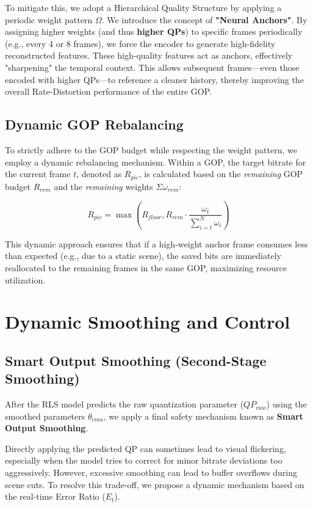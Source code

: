 To mitigate this, we adopt a Hierarchical Quality Structure by applying a periodic weight pattern $\Omega$. We introduce the concept of \textbf{"Neural Anchors"}. By assigning higher weights (and thus \textbf{higher QPs}) to specific frames periodically (e.g., every 4 or 8 frames), we force the encoder to generate high-fidelity reconstructed features. These high-quality features act as anchors, effectively "sharpening" the temporal context. This allows subsequent frames—even those encoded with higher QPs—to reference a cleaner history, thereby improving the overall Rate-Distortion performance of the entire GOP.

\subsection{Dynamic GOP Rebalancing}
To strictly adhere to the GOP budget while respecting the weight pattern, we employ a dynamic rebalancing mechanism. Within a GOP, the target bitrate for the current frame $t$, denoted as $R_{pic}$, is calculated based on the \textit{remaining} GOP budget $R_{rem}$ and the \textit{remaining} weights $\Sigma\omega_{rem}$:

\begin{equation}
    R_{pic} = \max\left(R_{floor}, R_{rem} \cdot \frac{\omega_t}{\sum_{i=t}^{N} \omega_i}\right)
\end{equation}

This dynamic approach ensures that if a high-weight anchor frame consumes less than expected (e.g., due to a static scene), the saved bits are immediately reallocated to the remaining frames in the same GOP, maximizing resource utilization.

\section{Dynamic Smoothing and Control}
\label{sec:control_logic}

\subsection{Smart Output Smoothing (Second-Stage Smoothing)}
After the RLS model predicts the raw quantization parameter ($QP_{raw}$) using the smoothed parameters $\theta_{ema}$, we apply a final safety mechanism known as \textbf{Smart Output Smoothing}.

Directly applying the predicted QP can sometimes lead to visual flickering, especially when the model tries to correct for minor bitrate deviations too aggressively. However, excessive smoothing can lead to buffer overflows during scene cuts. To resolve this trade-off, we propose a dynamic mechanism based on the real-time Error Ratio ($E_t$).


